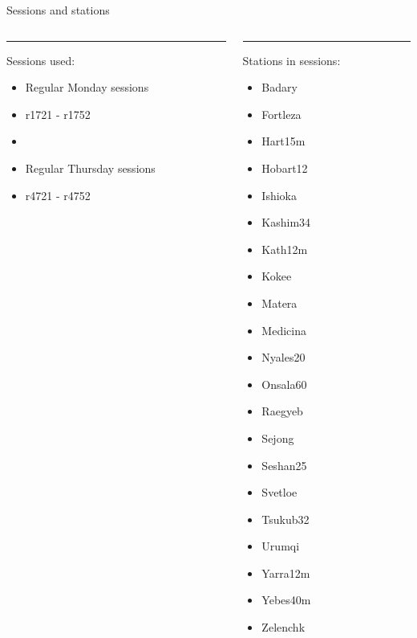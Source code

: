\documentclass{beamer}
\begin{document}
    \begin{frame}{Sessions and stations}
        \begin{columns}[T] %
            \begin{column}{.48\textwidth}
            \color{black}\rule{\linewidth}{4pt}
                Sessions used:
                \begin{itemize}
                    \item Regular Monday sessions
                    \item r1721 - r1752
                    \item   
                    \item Regular Thursday sessions
                    \item r4721 - r4752
                \end{itemize}

        \end{column}
        \hfill
        \begin{column}{.48\textwidth}
           \rule{\linewidth}{4pt}
                Stations in sessions:
                \begin{itemize}
                    \item Badary
                    \item Fortleza
                    \item Hart15m
                    \item Hobart12
                    \item Ishioka
                    \item Kashim34
                    \item Kath12m
                    \item Kokee
                    \item Matera
                    \item Medicina
                    \item Nyales20
                    \item Onsala60
                    \item Raegyeb
                    \item Sejong
                    \item Seshan25
                    \item Svetloe
                    \item Tsukub32
                    \item Urumqi
                    \item Yarra12m
                    \item Yebes40m
                    \item Zelenchk
                \end{itemize}

        \end{column}%
    \end{columns}
    \end{frame}
\end{document}
